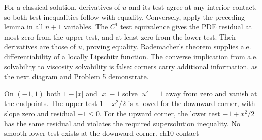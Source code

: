\begin{expandedproof}
For a classical solution, derivatives of $u$ and its test agree at any
interior contact, so both test inequalities follow with equality.
Conversely, apply the preceding lemma in all $n+1$ variables.
The $C^1$ test equivalence gives the PDE residual at most zero from
the upper test, and at least zero from the lower test. Their derivatives
are those of $u$, proving equality. Rademacher's theorem supplies a.e.
differentiability of a locally Lipschitz function. The converse implication
from a.e. solvability to viscosity solvability is false: corners carry
additional information, as the next diagram and Problem 5 demonstrate.
\end{expandedproof}
{On $(-1,1)$ both $1-|x|$ and $|x|-1$ solve $|u'|=1$ away from zero and vanish at the endpoints. The upper test $1-x^2/2$ is allowed for the downward corner, with slope zero and residual $-1\leq0$. For the upward corner, the lower test $-1+x^2/2$ has the same residual and violates the required supersolution inequality. No smooth lower test exists at the downward corner.}
{ch10-contact}
\Needspace{42mm}
